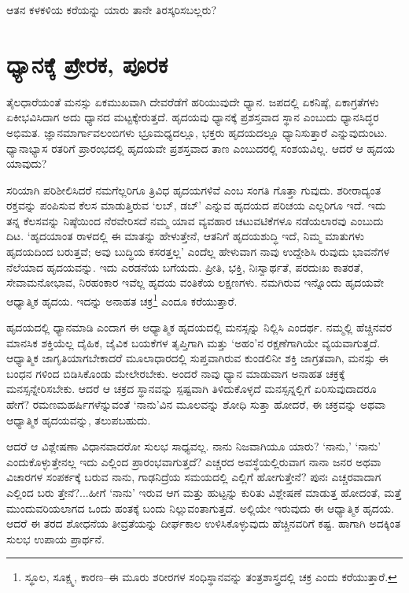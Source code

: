 ಆತನ ಕಳಕಳಿಯ ಕರೆಯನ್ನು ಯಾರು ತಾನೇ ತಿರಸ್ಕರಿಸಬಲ್ಲರು?


\section{ಧ್ಯಾನಕ್ಕೆ ಪ್ರೇರಕ, ಪೂರಕ}

ತೈಲಧಾರೆಯಂತೆ ಮನಸ್ಸು ಏಕಮುಖವಾಗಿ ದೇವರೆಡೆಗೆ ಹರಿಯುವುದೇ ಧ್ಯಾನ. ಜಪದಲ್ಲಿ ಏಕನಿಷ್ಠೆ, ಏಕಾಗ್ರತೆಗಳು ಏಕೀಭವಿಸಿದಾಗ ಅದು ಧ್ಯಾನದ ಮಟ್ಟಕ್ಕೇರುತ್ತದೆ. ಹೃದಯವು ಧ್ಯಾನಕ್ಕೆ ಪ್ರಶಸ್ತವಾದ ಸ್ಥಾನ ಎಂಬುದು ಧ್ಯಾನಸಿದ್ಧರ ಅಭಿಮತ. ಜ್ಞಾನಮಾರ್ಗಾವಲಂಬಿಗಳು ಭ್ರೂಮಧ್ಯದಲ್ಲೂ, ಭಕ್ತರು ಹೃದಯದಲ್ಲೂ ಧ್ಯಾನಿಸುತ್ತಾರೆ ಎನ್ನುವುದುಂಟು. ಧ್ಯಾನಾಭ್ಯಾಸ ರತರಿಗೆ ಪ್ರಾರಂಭದಲ್ಲಿ ಹೃದಯವೇ ಪ್ರಶಸ್ತವಾದ ತಾಣ ಎಂಬುದರಲ್ಲಿ ಸಂಶಯವಿಲ್ಲ. ಆದರೆ ಆ ಹೃದಯ ಯಾವುದು?

ಸರಿಯಾಗಿ ಪರಿಶೀಲಿಸಿದರೆ ನಮಗೆಲ್ಲರಿಗೂ ತ್ರಿವಿಧ ಹೃದಯಗಳಿವೆ ಎಂಬ ಸಂಗತಿ ಗೊತ್ತಾ ಗುವುದು. ಶರೀರಾದ್ಯಂತ ರಕ್ತವನ್ನು ಪಂಪಿಸುವ ಕೆಲಸ ಮಾಡುತ್ತಿರುವ ‘ಲಬ್, ಡಬ್​’ ಎನ್ನುವ ಹೃದಯದ ಪರಿಚಯ ಎಲ್ಲರಿಗೂ ಇದೆ. ಇದು ತನ್ನ ಕೆಲಸವನ್ನು ನಿಷ್ಠೆಯಿಂದ ನೆರವೇರಿಸದೆ ನಮ್ಮ ಯಾವ ವ್ಯವಹಾರ ಚಟುವಟಿಕೆಗಳೂ ನಡೆಯಲಾರವು ಎಂಬುದು ದಿಟ. ‘ಹೃದಯಾಂತ ರಾಳದಲ್ಲಿ ಈ ಮಾತನ್ನು ಹೇಳುತ್ತೇನೆ, ಆತನಿಗೆ ಹೃದಯಶುದ್ಧಿ ಇದೆ, ನಿಮ್ಮ ಮಾತುಗಳು ಹೃದಯದಿಂದ ಬರುತ್ತವೆ; ಅವು ಬುದ್ಧಿಯ ಕಸರತ್ತಲ್ಲ’ ಎಂದೆಲ್ಲ ಹೇಳುವಾಗ ನಾವು ಉದ್ದೇಶಿಸಿ ರುವುದು ಭಾವನೆಗಳ ನೆಲೆಯಾದ ಹೃದಯವನ್ನು. ಇದು ಎರಡನೆಯ ಬಗೆಯದು. ಪ್ರೀತಿ, ಭಕ್ತಿ, ನಿಃಸ್ವಾರ್ಥತೆ, ಪರದುಃಖ ಕಾತರತೆ, ಸೇವಾಮನೋಭಾವ, ನಿರಹಂಕಾರ ಇವೆಲ್ಲ ಹೃದಯ ವಂತಿಕೆಯ ಲಕ್ಷಣಗಳು. ನಮಗಿರುವ ಇನ್ನೊಂದು ಹೃದಯವೇ ಆಧ್ಯಾತ್ಮಿಕ ಹೃದಯ. ಇದನ್ನು ಅನಾಹತ ಚಕ್ರ\footnote{ ಸ್ಥೂಲ, ಸೂಕ್ಷ್ಮ, ಕಾರಣ–ಈ ಮೂರು ಶರೀರಗಳ ಸಂಧಿಸ್ಥಾನವನ್ನು ತಂತ್ರಶಾಸ್ತ್ರದಲ್ಲಿ ಚಕ್ರ ಎಂದು ಕರೆಯುತ್ತಾರೆ.} ಎಂದೂ ಕರೆಯುತ್ತಾರೆ.

ಹೃದಯದಲ್ಲಿ ಧ್ಯಾನಮಾಡಿ ಎಂದಾಗ ಈ ಆಧ್ಯಾತ್ಮಿಕ ಹೃದಯದಲ್ಲಿ ಮನಸ್ಸನ್ನು ನಿಲ್ಲಿಸಿ ಎಂದರ್ಥ. ನಮ್ಮಲ್ಲಿ ಹೆಚ್ಚಿನವರ ಮಾನಸಿಕ ಶಕ್ತಿಯೆಲ್ಲ ದೈಹಿಕ, ಜೈವಿಕ ಬಯಕೆಗಳ ತೃಪ್ತಿಗಾಗಿ ಮತ್ತು ‘ಅಹಂ’ನ ರಕ್ಷಣೆಗಾಗಿಯೇ ವ್ಯಯವಾಗುತ್ತದೆ. ಆಧ್ಯಾತ್ಮಿಕ ಜಾಗೃತಿಯಾಗಬೇಕಾದರೆ ಮೂಲಾಧಾರದಲ್ಲಿ ಸುಪ್ತವಾಗಿರುವ ಕುಂಡಲಿನೀ ಶಕ್ತಿ ಜಾಗ್ರತವಾಗಿ, ಮನಸ್ಸು ಈ ಬಂಧನ ಗಳಿಂದ ಬಿಡಿಸಿಕೊಂಡು ಮೇಲೇರಬೇಕು. ಅಂದರೆ ನಾವು ಧ್ಯಾನ ಮಾಡುವಾಗ ಅನಾಹತ ಚಕ್ರಕ್ಕೆ ಮನಸ್ಸನ್ನೇರಿಸಬೇಕು. ಆದರೆ ಆ ಚಕ್ರದ ಸ್ಥಾನವನ್ನು ಸ್ಪಷ್ಟವಾಗಿ ತಿಳಿದುಕೊಳ್ಳದೆ ಮನಸ್ಸನ್ನಲ್ಲಿಗೆ ಏರಿಸುವುದಾದರೂ ಹೇಗೆ? ರಮಣಮಹರ್ಷಿಗಳೆನ್ನುವಂತೆ ‘ನಾನು’ವಿನ ಮೂಲವನ್ನು ಶೋಧಿ ಸುತ್ತಾ ಹೋದರೆ, ಈ ಚಕ್ರವನ್ನು ಅಥವಾ ಆಧ್ಯಾತ್ಮಿಕ ಹೃದಯವನ್ನು, ತಲುಪಬಹುದು.

ಆದರೆ ಆ ವಿಶ್ಲೇಷಣಾ ವಿಧಾನವಾದರೋ ಸುಲಭ ಸಾಧ್ಯವಲ್ಲ. ನಾನು ನಿಜವಾಗಿಯೂ ಯಾರು? ‘ನಾನು,’ ‘ನಾನು’ ಎಂದುಕೊಳ್ಳುತ್ತೇನಲ್ಲ ಇದು ಎಲ್ಲಿಂದ ಪ್ರಾರಂಭವಾಗುತ್ತದೆ? ಎಚ್ಚರದ ಅವಸ್ಥೆಯಲ್ಲಿರುವಾಗ ನಾನಾ ಜನರ ಅಥವಾ ವಿಚಾರಗಳ ಸಂಪರ್ಕಕ್ಕೆ ಬರುವ ನಾನು, ಗಾಢನಿದ್ರೆಯ ಸಮಯದಲ್ಲಿ ಎಲ್ಲಿಗೆ ಹೋಗುತ್ತೇನೆ? ಪುನಃ ಎಚ್ಚರವಾದಾಗ ಎಲ್ಲಿಂದ ಬರು ತ್ತೇನೆ?...ಹೀಗೆ ‘ನಾನು’ ಇರುವ ಆಗ ಮತ್ತು ಹುಟ್ಟನ್ನು ಕುರಿತು ವಿಶ್ಲೇಷಣೆ ಮಾಡುತ್ತ ಹೋದಂತೆ, ಮತ್ತೆ ಮುಂದುವರಿಯಲಾಗದ ಒಂದು ಹಂತಕ್ಕೆ ಬಂದು ನಿಲ್ಲುವಂತಾಗುತ್ತದೆ. ಅಲ್ಲಿಯೇ ಇರುವುದು ಈ ಆಧ್ಯಾತ್ಮಿಕ ಹೃದಯ. ಆದರೆ ಈ ತರದ ಶೋಧನೆಯ ತೀವ್ರತೆಯನ್ನು ದೀರ್ಘಕಾಲ ಉಳಿಸಿಕೊಳ್ಳುವುದು ಹೆಚ್ಚಿನವರಿಗೆ ಕಷ್ಟ. ಹಾಗಾಗಿ ಅದಕ್ಕಿಂತ ಸುಲಭ ಉಪಾಯ ಪ್ರಾರ್ಥನೆ.

